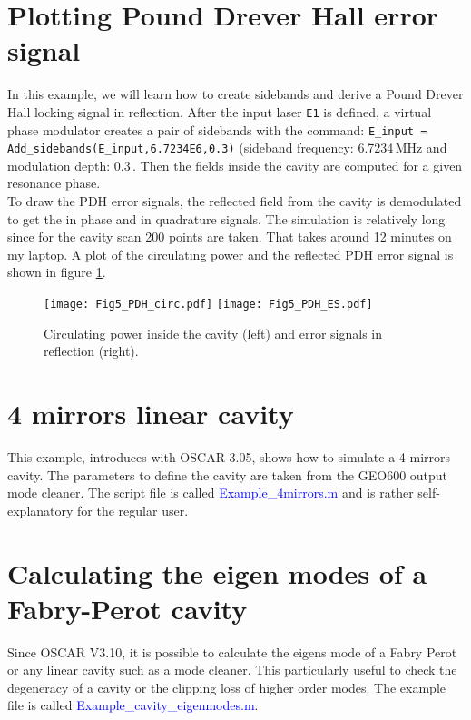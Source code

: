 \clearpage
\section{Plotting Pound Drever Hall error signal} \label{ch4:ex_PDH}

In this example, we will learn how to create sidebands and derive a Pound Drever Hall locking signal in reflection. After the input laser \verb|E1| is defined, a virtual phase modulator creates a pair of sidebands with the command: \verb|E_input = Add_sidebands(E_input,6.7234E6,0.3)| (sideband frequency: 6.7234\,MHz and modulation depth: 0.3\,. Then the fields inside the cavity are computed for a given resonance phase.\\

To draw the PDH error signals, the reflected field from the cavity is demodulated to get the in phase and in quadrature signals. The simulation is relatively long since for the cavity scan 200 points are taken. That takes around 12 minutes on my laptop. A plot of the circulating power and the reflected PDH error signal is shown in figure \ref{fig5:PDH}.

\begin{figure}
\begin{center}
\texttt{[image: Fig5\_PDH\_circ.pdf]}\hfill
\texttt{[image: Fig5\_PDH\_ES.pdf]}
\end{center}
\caption{\label{fig5:PDH} Circulating power inside the cavity (left) and error signals in reflection (right).}
\end{figure}

\section{4 mirrors linear cavity} \label{ch4:ex_OMC}

This example, introduces with OSCAR 3.05, shows how to simulate a 4 mirrors cavity. The parameters to define the cavity are taken from the GEO600 output mode cleaner. The script file is called \textcolor{blue}{Example\_4mirrors.m} and is rather self-explanatory for the regular user.

\section{Calculating the eigen modes of a Fabry-Perot cavity} \label{ch4:ex_OMC}

Since OSCAR V3.10, it is possible to calculate the eigens mode of a Fabry Perot or any linear cavity such as a mode cleaner. This particularly useful to check the degeneracy of a cavity or the clipping loss of higher order modes. The example file is called \textcolor{blue}{Example\_cavity\_eigenmodes.m}.

